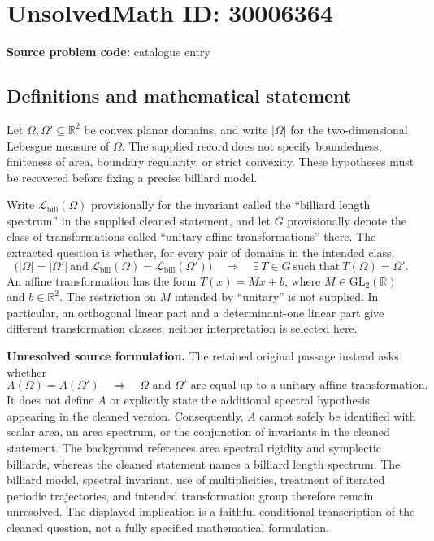 \documentclass[11pt]{article}
\newcommand{\R}{\mathbb{R}}
\begin{document}
\section*{UnsolvedMath ID: 30006364}
\textbf{Source problem code:} catalogue entry
\subsection{Definitions and mathematical statement}
Let \(\Omega,\Omega'\subseteq\R^2\) be convex planar domains, and write \(|\Omega|\) for the two-dimensional Lebesgue measure of \(\Omega\). The supplied record does not specify boundedness, finiteness of area, boundary regularity, or strict convexity. These hypotheses must be recovered before fixing a precise billiard model.

Write \(\mathcal L_{\mathrm{bill}}(\Omega)\) provisionally for the invariant called the ``billiard length spectrum'' in the supplied cleaned statement, and let \(G\) provisionally denote the class of transformations called ``unitary affine transformations'' there. The extracted question is whether, for every pair of domains in the intended class,
\[
\bigl(|\Omega|=|\Omega'|\ \text{and}\ \mathcal L_{\mathrm{bill}}(\Omega)=\mathcal L_{\mathrm{bill}}(\Omega')\bigr)
\quad\Longrightarrow\quad
\exists\,T\in G\ \text{such that}\ T(\Omega)=\Omega'.
\]
An affine transformation has the form \(T(x)=Mx+b\), where \(M\in\mathrm{GL}_2(\R)\) and \(b\in\R^2\). The restriction on \(M\) intended by ``unitary'' is not supplied. In particular, an orthogonal linear part and a determinant-one linear part give different transformation classes; neither interpretation is selected here.

\textbf{Unresolved source formulation.} The retained original passage instead asks whether
\[
A(\Omega)=A(\Omega')
\quad\Longrightarrow\quad
\Omega\text{ and }\Omega'\text{ are equal up to a unitary affine transformation}.
\]
It does not define \(A\) or explicitly state the additional spectral hypothesis appearing in the cleaned version. Consequently, \(A\) cannot safely be identified with scalar area, an area spectrum, or the conjunction of invariants in the cleaned statement. The background references area spectral rigidity and symplectic billiards, whereas the cleaned statement names a billiard length spectrum. The billiard model, spectral invariant, use of multiplicities, treatment of iterated periodic trajectories, and intended transformation group therefore remain unresolved. The displayed implication is a faithful conditional transcription of the cleaned question, not a fully specified mathematical formulation.
\end{document}
